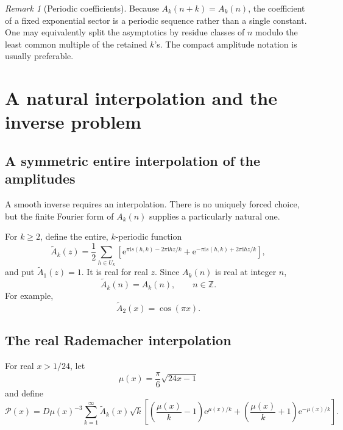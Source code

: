 \documentclass[11pt]{article}
\numberwithin{equation}{section}
\theoremstyle{mainthm}
\theoremstyle{defstyle}
\theoremstyle{remark}
\newtheorem{remark}[theorem]{Remark}
\newcommand{\e}{\mathrm e}
\newcommand{\ii}{\mathrm i}
\newcommand{\Pcal}{\mathcal P}
\begin{document}
\begin{remark}[Periodic coefficients]
Because \(A_k(n+k)=A_k(n)\), the coefficient of a fixed exponential sector is a periodic sequence rather than a single constant.  One may equivalently split the asymptotics by residue classes of \(n\) modulo the least common multiple of the retained \(k\)'s.  The compact amplitude notation is usually preferable.
\end{remark}

\section{A natural interpolation and the inverse problem}\label{sec:interpolation}

\subsection{A symmetric entire interpolation of the amplitudes}

A smooth inverse requires an interpolation.  There is no uniquely forced choice, but the finite Fourier form of \(A_k(n)\) supplies a particularly natural one.

For \(k\ge2\), define the entire, \(k\)-periodic function
\begin{equation}\label{eq:Atilde-def}
 \widetilde A_k(z)=\frac12\sum_{h\in U_k}
 \left[
 \e^{\pi\ii s(h,k)-2\pi\ii hz/k}
 +\e^{-\pi\ii s(h,k)+2\pi\ii hz/k}
 \right],
\end{equation}
and put \(\widetilde A_1(z)=1\).  It is real for real \(z\).  Since \(A_k(n)\) is real at integer \(n\),
\begin{equation}\label{eq:Atilde-interpolates}
 \widetilde A_k(n)=A_k(n),\qquad n\in\mathbb Z.
\end{equation}
For example,
\begin{equation}\label{eq:Atilde2}
 \widetilde A_2(x)=\cos(\pi x).
\end{equation}

\subsection{The real Rademacher interpolation}

For real \(x>1/24\), let
\begin{equation}\label{eq:mu-x}
 \mu(x)=\frac\pi6\sqrt{24x-1}
\end{equation}
and define
\begin{equation}\label{eq:Pcal-def}
 \Pcal(x)=D\mu(x)^{-3}\sum_{k=1}^{\infty}\widetilde A_k(x)\sqrt{k}
 \left[
 \left(\frac{\mu(x)}k-1\right)\e^{\mu(x)/k}
 +\left(\frac{\mu(x)}k+1\right)\e^{-\mu(x)/k}
 \right].
\end{equation}
\end{document}

